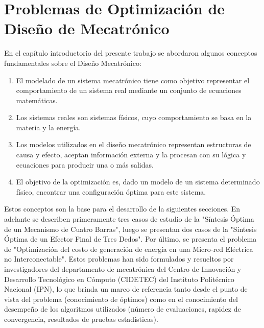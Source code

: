 \chapter{Problemas de Optimización de Diseño de Mecatrónico} 
\label{Chapter5} 
En el capítulo introductorio del presente trabajo se abordaron algunos conceptos fundamentales sobre el Diseño Mecatrónico:
\begin{enumerate}
\item El modelado de un sistema mecatrónico tiene como objetivo representar el comportamiento de un sistema real mediante un conjunto de ecuaciones matemáticas.
\item Los sistemas reales son sistemas físicos, cuyo comportamiento se basa en la materia y la energía.
\item   Los modelos utilizados en el diseño mecatrónico representan estructuras de causa y efecto, aceptan información externa y la procesan con su lógica y ecuaciones para producir una o más salidas. 
\item El objetivo de la optimización es, dado un modelo de un sistema determinado físico, encontrar una configuración óptima para este sistema. 
\end{enumerate}
Estos conceptos son la base para el desarrollo de la siguientes secciones. En adelante se describen primeramente tres casos de estudio de la "Síntesis Óptima de un Mecanismo de Cuatro Barras", luego se presentan dos casos de la "{Síntesis Óptima de un Efector Final de Tres Dedos}". Por último, se presenta el problema de "{Optimización del costo de generación de energía en una Micro-red Eléctrica no Interconectable}". Estos problemas han sido formulados y resueltos por investigadores del departamento de mecatrónica del Centro de Innovación y Desarrollo Tecnológico en Cómputo (CIDETEC) del Instituto Politécnico Nacional (IPN), lo que brinda un marco de referencia tanto desde el punto de vista del problema (conocimiento de óptimos) como en el conocimiento del desempeño de los algoritmos utilizados (número de evaluaciones, rapidez de convergencia, resultados de pruebas estadísticas).


